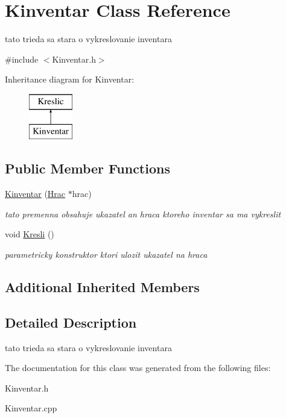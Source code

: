 \hypertarget{class_kinventar}{\section{Kinventar Class Reference}
\label{class_kinventar}
}


tato trieda sa stara o vykreslovanie inventara  




{\ttfamily \#include $<$Kinventar.\-h$>$}

Inheritance diagram for Kinventar\-:\begin{figure}[H]
\begin{center}
\leavevmode
\includegraphics[height=2.000000cm]{class_kinventar}
\end{center}
\end{figure}
\subsection*{Public Member Functions}
\begin{DoxyCompactItemize}
\item 
\hypertarget{class_kinventar_ab811ba9d0843cdd16fd45bf5461f1d8c}{\hyperlink{class_kinventar_ab811ba9d0843cdd16fd45bf5461f1d8c}{Kinventar} (\hyperlink{class_hrac}{Hrac} $\ast$hrac)}\label{class_kinventar_ab811ba9d0843cdd16fd45bf5461f1d8c}

\begin{DoxyCompactList}\small\item\em tato premenna obsahuje ukazatel an hraca ktoreho inventar sa ma vykreslit \end{DoxyCompactList}\item 
\hypertarget{class_kinventar_a4177cf7447c74ff5d582c415146845e4}{void \hyperlink{class_kinventar_a4177cf7447c74ff5d582c415146845e4}{Kresli} ()}\label{class_kinventar_a4177cf7447c74ff5d582c415146845e4}

\begin{DoxyCompactList}\small\item\em parametricky konstruktor ktori ulozit ukazatel na hraca \end{DoxyCompactList}\end{DoxyCompactItemize}
\subsection*{Additional Inherited Members}


\subsection{Detailed Description}
tato trieda sa stara o vykreslovanie inventara 

The documentation for this class was generated from the following files\-:\begin{DoxyCompactItemize}
\item 
Kinventar.\-h\item 
Kinventar.\-cpp\end{DoxyCompactItemize}
